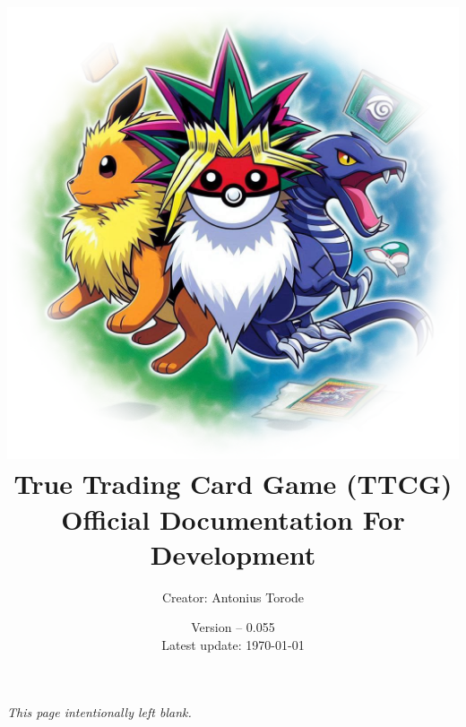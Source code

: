 \documentclass[openany,a4paper,10pt]{book}
\title{\vspace{0.1cm}  \includegraphics[scale=0.5]{./images/man_cover.png} \vspace{.5cm} \\ True Trading Card Game (TTCG) \\ Official Documentation For Development}
\author{Creator: Antonius Torode}
\date{Version -- 0.055 \\ Latest update: \today}
\begin{document}
\frontmatter
\maketitle

\tableofcontents
\newpage
\vspace*{\fill}
\begin{center}
	\textit{This page intentionally left blank.}
\end{center}
\vspace*{\fill}

\mainmatter
\pagestyle{fancy}
\fancyhf{}
\fancyhead[RO, LE]{\thepage}










\backmatter


\printindex
\end{document}
